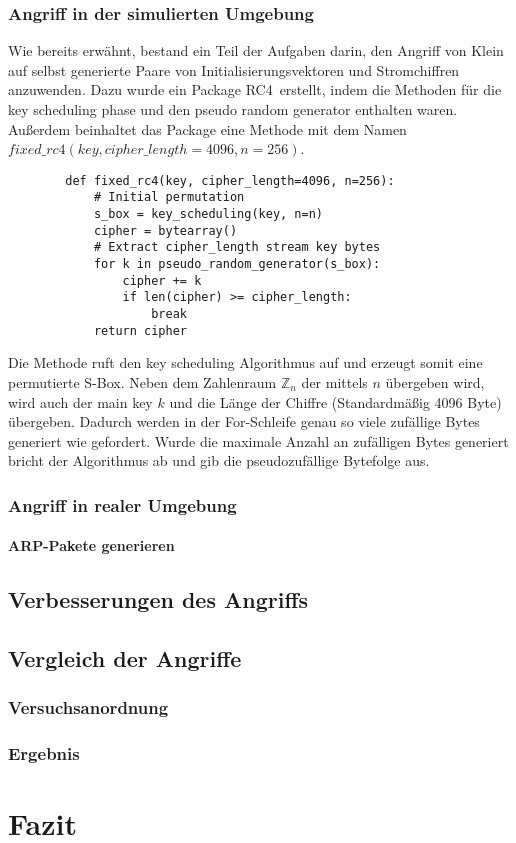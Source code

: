 \documentclass[10pt,a4paper]{article}
\begin{document}
\subsubsection{Angriff in der simulierten Umgebung}
Wie bereits erwähnt, bestand ein Teil der Aufgaben darin, den Angriff von Klein auf selbst generierte Paare von Initialisierungsvektoren und Stromchiffren anzuwenden. Dazu wurde ein Package \glqq RC4\grqq\ erstellt, indem die Methoden für die key scheduling phase und den pseudo random generator enthalten waren. Außerdem beinhaltet das Package eine Methode mit dem Namen $fixed\_rc4(key, cipher\_length=4096, n=256)$.
\begin{lstlisting}
		def fixed_rc4(key, cipher_length=4096, n=256):
    		# Initial permutation
    		s_box = key_scheduling(key, n=n)
    		cipher = bytearray()
    		# Extract cipher_length stream key bytes
    		for k in pseudo_random_generator(s_box):
        		cipher += k
        		if len(cipher) >= cipher_length:
            		break
    		return cipher
\end{lstlisting}
Die Methode ruft den key scheduling Algorithmus auf und erzeugt somit eine permutierte S-Box. Neben dem Zahlenraum $\mathbb{Z}_n$ der mittels $n$ übergeben wird, wird auch der main key $k$ und die Länge der Chiffre (Standardmäßig 4096 Byte) übergeben. Dadurch werden in der For-Schleife genau so viele zufällige Bytes generiert wie gefordert. Wurde die maximale Anzahl an zufälligen Bytes generiert bricht der Algorithmus ab und gib die pseudozufällige Bytefolge aus.
\subsubsection{Angriff in realer Umgebung}
\paragraph{ARP-Pakete generieren}

\subsection{Verbesserungen des Angriffs}

\subsection{Vergleich der Angriffe}

\subsubsection{Versuchsanordnung}

\subsubsection{Ergebnis}

\section{Fazit}
\end{document}
